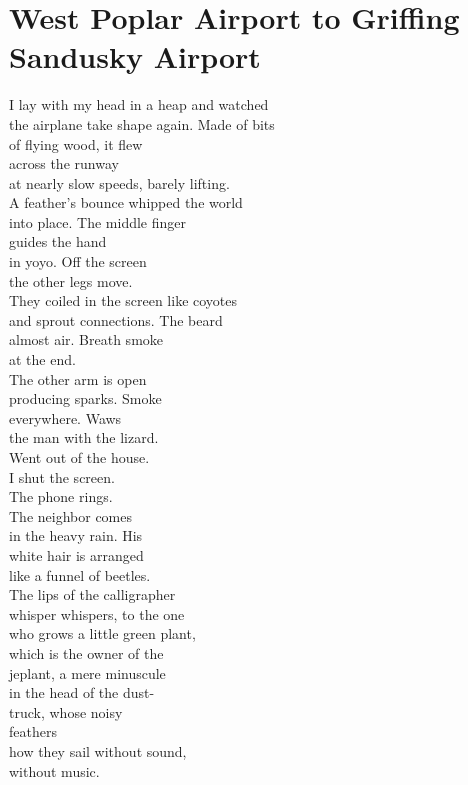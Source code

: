\documentclass[smalldemyvopaper,11pt,twoside,onecolumn,openright,extrafontsizes]{memoir}
\begin{document}
\chapter{West Poplar Airport to Griffing Sandusky Airport}
I lay with my head in a heap and watched
\\the airplane take shape again. Made of bits
\\of flying wood, it flew
\\across the runway
\\at nearly slow speeds, barely lifting.
\\A feather's bounce whipped the world
\\into place.   The middle finger
\\guides the hand
\\in yoyo.   Off the screen
\\the other legs move.
\\They coiled in the screen like coyotes
\\and sprout connections.   The beard
\\almost air.   Breath smoke
\\at the end.
\\The other arm is open
\\producing sparks.   Smoke
\\everywhere.   Waws
\\the man with the lizard.
\\Went out of the house.
\\I shut the screen.
\\The phone rings.
\\The neighbor comes
\\in the heavy rain.   His
\\white hair is arranged
\\like a funnel of beetles.
\\The lips of the calligrapher
\\whisper whispers, to the one
\\who grows a little green plant,
\\which is the owner of the
\\jeplant, a mere minuscule
\\in the head of the dust-
\\truck, whose noisy
\\feathers
\\how they sail without sound,
\\without music.
\end{document}
